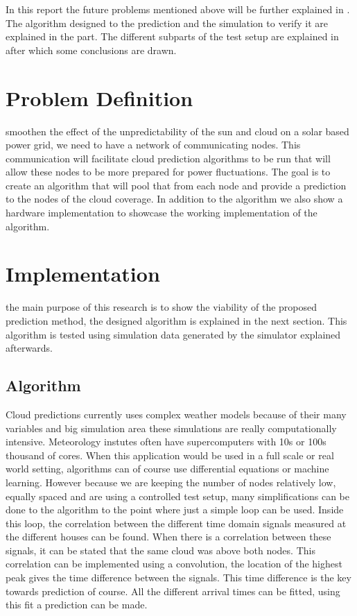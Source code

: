 \documentclass[a4paper,journal]{DDREAM}
\begin{document}
In this report the future problems mentioned above will be further explained in .
The algorithm designed to the prediction and the simulation to verify it are explained in the  part.
The different subparts of the test setup are explained in  after which some conclusions are drawn.

\section{Problem Definition}\label{sec:problem_definition}
 smoothen the effect of the unpredictability of the sun and cloud on a solar based power grid, we need to have a network of communicating nodes. This communication will facilitate cloud prediction algorithms to be run that will allow these nodes to be more prepared for power fluctuations. The goal is to create an algorithm that will pool that from each node and provide a prediction to the nodes of the cloud coverage. In addition to the algorithm we also show a hardware implementation to showcase the working implementation of the algorithm.\clearpage

\section{Implementation}\label{sec:implementation}
 the main purpose of this research is to show the viability of the proposed prediction method, the designed algorithm is explained in the next section.
This algorithm is tested using simulation data generated by the simulator explained afterwards.

\subsection{Algorithm}\label{sec:implementation-algorithm}
Cloud predictions currently uses complex weather models because of their many variables and big simulation area these simulations are really computationally intensive.
Meteorology instutes often have supercomputers with 10s or 100s thousand of cores.
When this application would be used in a full scale or real world setting, algorithms can of course use differential equations or machine learning.
However because we are keeping the number of nodes relatively low, equally spaced and are using a controlled test setup, many simplifications can be done to the algorithm to the point where just a simple loop can be used.
Inside this loop, the correlation between the different time domain signals measured at the different houses can be found.
When there is a correlation between these signals, it can be stated that the same cloud was above both nodes.
This correlation can be implemented using a convolution, the location of the highest peak gives the time difference between the signals.
This time difference is the key towards prediction of course.
All the different arrival times can be fitted, using this fit a prediction can be made.
\end{document}
